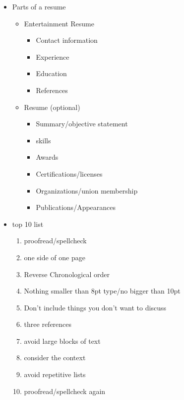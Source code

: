 \documentclass[12pt]{article}
\begin{document}
\begin{itemize}
                \item Parts of a resume
                \begin{itemize}
                    \item Entertainment Resume
                    \begin{itemize}
                        \item Contact information
                        \item Experience
                        \item Education
                        \item References
                    \end{itemize}
                    \item Resume (optional)
                    \begin{itemize}
                        \item Summary/objective statement
                        \item skills
                        \item Awards
                        \item Certifications/licenses
                        \item Organizations/union membership
                        \item Publications/Appearances
                    \end{itemize}
                \end{itemize}
                \newpage
                \item top 10 list
                \begin{enumerate}
                    \item proofread/spellcheck
                    \item one side of one page
                    \item Reverse Chronological order
                    \item Nothing smaller than 8pt type/no bigger than 10pt
                    \item Don't include things you don't want to discuss
                    \item three references
                    \item avoid large blocks of text
                    \item consider the context
                    \item avoid repetitive lists
                    \item proofread/spellcheck again
                \end{enumerate}
            \end{itemize}
            \newpage
\end{document}
